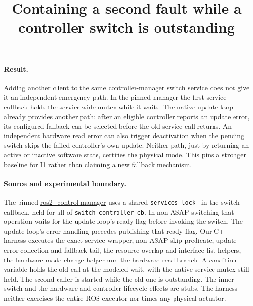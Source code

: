 \documentclass{article}
\title{Containing a second fault while a controller switch is outstanding}
\begin{document}
\maketitle

\paragraph{Result.}
Adding another client to the same controller-manager switch service
does not give it an independent emergency path. In the pinned manager
the first service callback holds the service-wide mutex while it waits.
The native update loop already provides another path: after an
eligible controller reports an update error, its configured fallback
can be selected before the old service call returns. An independent
hardware read error can also trigger deactivation when the pending
switch skips the failed controller's own update. Neither path,
just by returning an active or inactive software state, certifies
the physical mode. This pins a stronger baseline for I1 rather than
claiming a new fallback mechanism.

\paragraph{Source and experimental boundary.}
The pinned \href{https://github.com/ros-controls/ros2_control/blob/0c94b008a82731967ba89e2e7379ec6d2f07580b/controller_manager/src/controller_manager.cpp}{ros2\_control
manager} uses a shared \texttt{services\_lock\_} in the switch callback,
held for all of \texttt{switch\_controller\_cb}. In non-ASAP switching
that operation waits for the update loop's ready flag before invoking
the switch. The update loop's error handling precedes publishing that
ready flag. Our C++ harness executes the exact service wrapper,
non-ASAP skip predicate, update-error collection and fallback tail,
the resource-overlap and interface-list helpers, the hardware-mode
change helper and the hardware-read branch. A condition variable
holds the old call at the modeled wait, with the native service mutex
still held. The second caller is started while the old
one is outstanding. The inner switch and the hardware and controller
lifecycle effects are stubs. The harness neither exercises the
entire ROS executor nor times any physical actuator.
\end{document}
